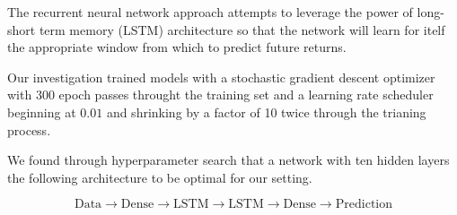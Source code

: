 The recurrent neural network approach attempts to leverage the power of long-short term memory (LSTM) architecture so that the network will learn for itelf the appropriate window from which to predict future returns.

Our investigation trained models with a stochastic gradient descent optimizer with 300 epoch passes throught the training set and a learning rate scheduler beginning at $0.01$ and shrinking by a factor of 10 twice through the trianing process.

We found through hyperparameter search that a network with ten hidden layers the following architecture to be optimal for our setting.

\[
\mathrm{Data}
\rightarrow \mathrm{Dense} 
\rightarrow \mathrm{LSTM}
\rightarrow \mathrm{LSTM}
\rightarrow\mathrm{Dense}
\rightarrow \mathrm{Prediction}
\]

